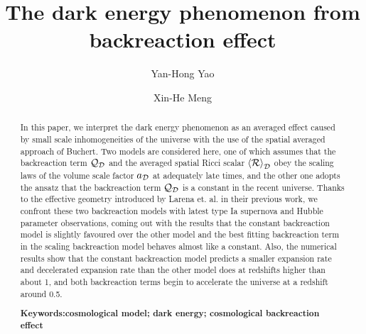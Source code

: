 \documentclass[preprint,preprintnumbers, prd, floatfix,  superscriptaddress,nofootinbib] {revtex4-1}
\newcommand{\CD}{{\cal D}}
\newcommand{\CR}{{\cal R}}
\newcommand{\average}[1]{\left\langle #1 \right\rangle_\CD}
\begin{document}
\title{The dark energy phenomenon from backreaction effect }


\author{Yan-Hong Yao}
\author{Xin-He Meng}


\begin{abstract}
In this paper, we interpret the dark energy phenomenon as an averaged effect caused by small scale inhomogeneities of the universe with the use of the spatial averaged approach of Buchert. Two models are considered here, one of which assumes that the backreaction term ${\cal Q}_\CD$ and the averaged spatial Ricci scalar $\average{\CR}$ obey the scaling laws of the volume scale factor $a_\CD$ at adequately late times, and the other one adopts the ansatz that the backreaction term ${\cal Q}_\CD$ is a constant in the recent universe. Thanks to the effective geometry introduced by Larena et. al. in their previous work, we confront these two backreaction models with latest type Ia supernova and Hubble parameter observations, coming out with the results that the constant backreaction model is slightly favoured over the other model and the best fitting backreaction term in the scaling backreaction model behaves almost like a constant. Also, the numerical results show that the constant backreaction model predicts a smaller expansion rate and decelerated expansion rate than the other model does at redshifts higher than about 1, and both backreaction terms begin to accelerate the universe at a redshift around 0.5.

\textbf{Keywords:cosmological model; dark energy; cosmological backreaction effect}
\end{abstract}

\maketitle
\end{document}
